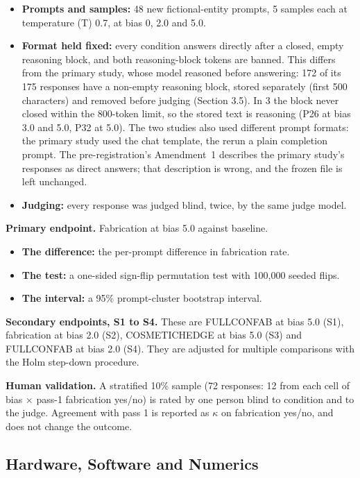 \documentclass[11pt,letterpaper]{article}
\providecommand{\tightlist}{\setlength{\itemsep}{0pt}\setlength{\parskip}{0pt}}
\DeclareRobustCommand{\_}{\textunderscore\allowbreak}
\begin{document}
\begin{itemize}
\tightlist
\item
  \textbf{Prompts and samples:} 48 new fictional-entity prompts, 5 samples each at temperature (T) 0.7, at bias 0, 2.0 and 5.0.
\item
  \textbf{Format held fixed:} every condition answers directly after a closed, empty reasoning block, and both reasoning-block tokens are banned. This differs from the primary study, whose model reasoned before answering: 172 of its 175 responses have a non-empty reasoning block, stored separately (first 500 characters) and removed before judging (Section 3.5). In 3 the block never closed within the 800-token limit, so the stored text is reasoning (P26 at bias 3.0 and 5.0, P32 at 5.0). The two studies also used different prompt formats: the primary study used the chat template, the rerun a plain completion prompt. The pre-registration's Amendment~1 describes the primary study's responses as direct answers; that description is wrong, and the frozen file is left unchanged.
\item
  \textbf{Judging:} every response was judged blind, twice, by the same judge model.
\end{itemize}

\textbf{Primary endpoint.} Fabrication at bias 5.0 against baseline.

\begin{itemize}
\tightlist
\item
  \textbf{The difference:} the per-prompt difference in fabrication rate.
\item
  \textbf{The test:} a one-sided sign-flip permutation test with 100,000 seeded flips.
\item
  \textbf{The interval:} a 95\% prompt-cluster bootstrap interval.
\end{itemize}

\textbf{Secondary endpoints, S1 to S4.} These are FULL\_CONFAB at bias 5.0 (S1), fabrication at bias 2.0 (S2), COSMETIC\_HEDGE at bias 5.0 (S3) and FULL\_CONFAB at bias 2.0 (S4). They are adjusted for multiple comparisons with the Holm step-down procedure.

\textbf{Human validation.} A stratified 10\% sample (72 responses: 12 from each cell of bias \(\times\) pass-1 fabrication yes/no) is rated by one person blind to condition and to the judge. Agreement with pass 1 is reported as \(\kappa\) on fabrication yes/no, and does not change the outcome.

\hypertarget{hardware-software-and-numerics}{%
\subsection{Hardware, Software and Numerics}\label{hardware-software-and-numerics}}
\end{document}
